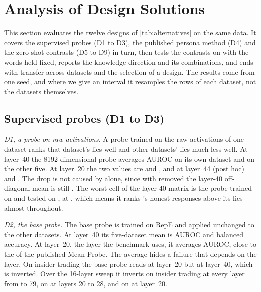 \FloatBarrier
\section{Analysis of Design Solutions}
\label{sec:analysis}

This section evaluates the twelve designs of \cref{tab:alternatives} on the same data. It covers the
supervised probes (D1 to D3), the published persona method (D4) and the zero-shot contrasts (D5 to D9)
in turn, then tests the contrasts on \hpkr{} with the words held fixed, reports the knowledge direction
and its combinations, and ends with transfer across datasets and the selection of a design. The
results come from one seed, and where we give an interval it resamples the rows of each dataset, not
the datasets themselves.

\subsection{Supervised probes (D1 to D3)}
\label{sec:supervised}

\emph{D1, a probe on raw activations.} A probe trained on the raw activations of one dataset
ranks that dataset's lies well and other datasets' lies much less well. At layer~40 the
8192-dimensional probe averages  AUROC on its own dataset and  on
the other five. At layer~20 the two values are  and , and at
layer~44 (post hoc)  and . The drop is not caused by \hpkr{} alone,
since with \hpkr{} removed the layer-40 off-diagonal mean is still . The worst cell
of the layer-40 matrix is the probe trained on  and tested on
, at , which means it ranks \hpkr's honest responses above
its lies almost throughout.

\emph{D2, the base probe.} The base probe is trained on RepE and applied unchanged to the other
datasets. At layer~40 its five-dataset mean is  AUROC and 
balanced accuracy. At layer~20, the layer the benchmark uses, it averages  AUROC,
close to the  of the published Mean Probe. The average hides a failure that
depends on the layer. On insider trading the base probe reads  at layer~20 but
 at layer~40, which is inverted. Over the 16-layer sweep it inverts on insider
trading at every layer from  to 79, on \hpkr{} at layers 20 to 28, and
on \hpc{} at layer~20.

